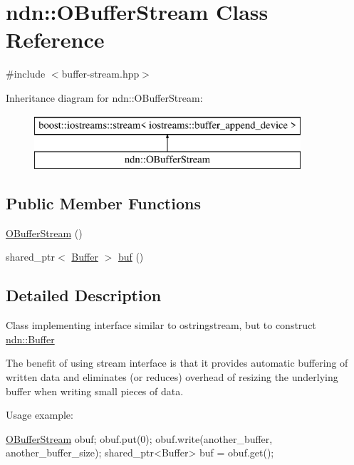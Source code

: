 \hypertarget{classndn_1_1OBufferStream}{}\section{ndn\+:\+:O\+Buffer\+Stream Class Reference}
\label{classndn_1_1OBufferStream}


{\ttfamily \#include $<$buffer-\/stream.\+hpp$>$}

Inheritance diagram for ndn\+:\+:O\+Buffer\+Stream\+:\begin{figure}[H]
\begin{center}
\leavevmode
\includegraphics[height=2.000000cm]{classndn_1_1OBufferStream}
\end{center}
\end{figure}
\subsection*{Public Member Functions}
\begin{DoxyCompactItemize}
\item 
\hyperlink{classndn_1_1OBufferStream_aabb59d023a5836dfa32576f7b205311c}{O\+Buffer\+Stream} ()
\item 
shared\+\_\+ptr$<$ \hyperlink{classndn_1_1Buffer}{Buffer} $>$ \hyperlink{classndn_1_1OBufferStream_a58e3f5a6678e2a58d5f1e7a300f210a5}{buf} ()
\end{DoxyCompactItemize}


\subsection{Detailed Description}
Class implementing interface similar to ostringstream, but to construct \hyperlink{classndn_1_1Buffer}{ndn\+::\+Buffer}

The benefit of using stream interface is that it provides automatic buffering of written data and eliminates (or reduces) overhead of resizing the underlying buffer when writing small pieces of data.

Usage example\+: 
\begin{DoxyCode}
\hyperlink{classndn_1_1OBufferStream_aabb59d023a5836dfa32576f7b205311c}{OBufferStream} obuf;
obuf.put(0);
obuf.write(another\_buffer, another\_buffer\_size);
shared\_ptr<Buffer> buf = obuf.get();
\end{DoxyCode}
 

